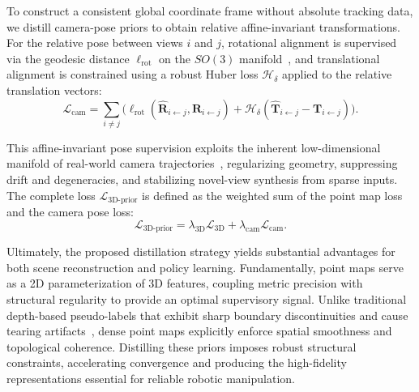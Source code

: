 To construct a consistent global coordinate frame without absolute tracking data, we distill camera-pose priors to obtain relative affine-invariant transformations. For the relative pose between views $i$ and $j$, rotational alignment is supervised via the geodesic distance $\ell_{\text{rot}}$ on the $SO(3)$ manifold~\cite{chowdhury2022unsupervised}, and translational alignment is constrained using a robust Huber loss $\mathcal{H}_{\delta}$ applied to the relative translation vectors:
\begin{equation}
\mathcal{L}_{\text{cam}} \!=\! \sum_{i \neq j} \Big( \ell_{\text{rot}}(\boldsymbol{\hat{R}}_{i\leftarrow j}, \boldsymbol{R}_{i\leftarrow j}) +  \mathcal{H}_{\delta}(\boldsymbol{\hat{T}}_{i\leftarrow j} - \boldsymbol{T}_{i\leftarrow j})\Big).
\label{eq:cam_loss}
\end{equation}

This affine-invariant pose supervision exploits the inherent low-dimensional manifold of real-world camera trajectories~\cite{wang2025pi}, regularizing geometry, suppressing drift and degeneracies, and stabilizing novel-view synthesis from sparse inputs. The complete loss \(\mathcal{L}_{\text{3D-prior}}\) is defined as the weighted sum of the point map loss and the camera pose loss:
\begin{equation}
\mathcal{L}_{\text{3D-prior}} = \lambda_{\text{3D}} \mathcal{L}_{\text{3D}} + \lambda_{\text{cam}} \mathcal{L}_{\text{cam}}.
\label{eq:prior_loss}
\end{equation}

Ultimately, the proposed distillation strategy yields substantial advantages for both scene reconstruction and policy learning. Fundamentally, point maps serve as a 2D parameterization of 3D features, coupling metric precision with structural regularity to provide an optimal supervisory signal. Unlike traditional depth-based pseudo-labels that exhibit sharp boundary discontinuities and cause tearing artifacts~\cite{jiang2025anysplat}, dense point maps explicitly enforce spatial smoothness and topological coherence. Distilling these priors imposes robust structural constraints, accelerating convergence and producing the high-fidelity representations essential for reliable robotic manipulation.


